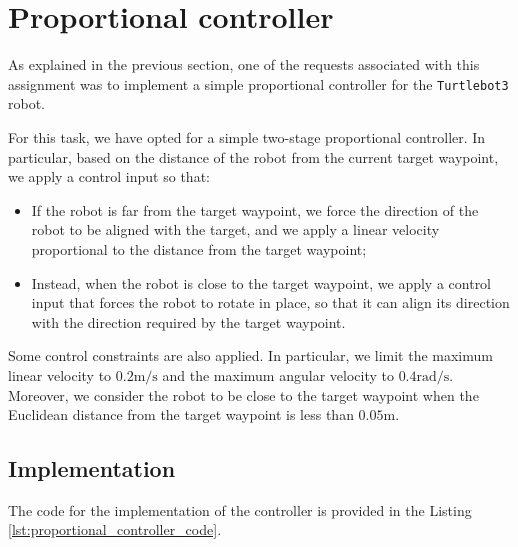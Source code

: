 \section{Proportional controller}
\label{sec:proportional_controller}

As explained in the previous section, one of the requests associated with this assignment was to implement a simple proportional controller for the \texttt{Turtlebot3} robot.

For this task, we have opted for a simple two-stage proportional controller.
In particular, based on the distance of the robot from the current target waypoint, we apply a control input so that:

\begin{itemize}
    \item If the robot is far from the target waypoint, we force the direction of the robot to be aligned with the target, and we apply a linear velocity proportional to the distance from the target waypoint;
    \item Instead, when the robot is close to the target waypoint, we apply a control input that forces the robot to rotate in place, so that it can align its direction with the direction required by the target waypoint.
\end{itemize}

Some control constraints are also applied.
In particular, we limit the maximum linear velocity to $0.2 \text{m/s}$ and the maximum angular velocity to $0.4 \text{rad/s}$.
Moreover, we consider the robot to be close to the target waypoint when the Euclidean distance from the target waypoint is less than $0.05 \text{m}$.



\subsection{Implementation}
\label{subsec:implementation_proportional_controller}

The code for the implementation of the controller is provided in the Listing \ref{lst:proportional_controller_code}.

